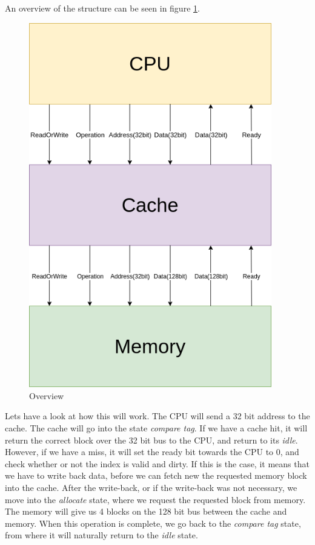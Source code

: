 \documentclass{article}
\begin{document}
An overview of the structure can be seen in figure \ref{OVERVIEW}.

\begin{figure}[H]
 \centering
  \includegraphics[width=300pt]{img/OverviewBlock.png}
 \caption{Overview}
  \label{OVERVIEW}
 \end{figure}

Lets have a look at how this will work. The CPU will send a 32 bit address to the cache. The cache will go into the state \textit{compare tag}. If we have a cache hit, it will return the correct block over the 32 bit bus to the CPU, and return to its \textit{idle}. However, if we have a miss, it will set the ready bit towards the CPU to 0, and check whether or not the index is valid and dirty. If this is the case, it means that we have to write back data, before we can fetch new the requested memory block into the cache. After the write-back, or if the write-back was not necessary, we move into the \textit{allocate} state, where we request the requested block from memory. The memory will give us 4 blocks on the 128 bit bus between the cache and memory. When this operation is complete, we go back to the \textit{compare tag} state, from where it will naturally return to the \textit{idle} state.
\end{document}
